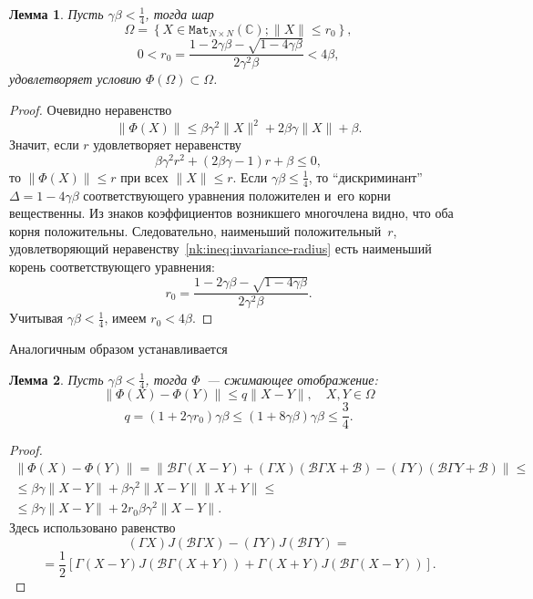 \documentclass[14pt,a4paper]{extarticle}
\numberwithin{equation}{section}
\newtheorem{lem}{Лемма}
\theoremstyle{definition}
\begin{document}
\begin{lem}
    Пусть \( \gamma\beta < \frac14\),
    тогда шар
    \[
        \Omega = \left\{ X\in \mathtt{Mat}_{N{\times}N}(\mathbb{C}); \|X\| \leq r_0 \right\}, \]
    \[  0 < r_0 = \frac{1 - 2\gamma\beta - \sqrt{1-4\gamma\beta}}{2\gamma^2\beta} < 4\beta, \]
    удовле\-творяет условию \( \Phi(\Omega)\subset\Omega \).
\end{lem}
\begin{proof}
Очевидно неравенство
    \[ \| \Phi(X) \| \leq
     \beta \gamma^2 \|X\|^2 + 2\beta\gamma\|X\| + \beta. \]
Значит, если \( r \) удовле\-творяет неравенству
    \begin{equation}\label{nk:ineq:invariance-radius}
        \beta \gamma^2 r^2 + (2\beta\gamma - 1)r + \beta \leq 0,
    \end{equation}
    то \( \|\Phi(X)\| \leq r \) при всех \( \|X\| \leq r \).
Если \( \gamma\beta \leq \frac14 \),
    то ``дискриминант'' \( \Delta = 1-4\gamma\beta \)
    соответствующего уравнения положителен и~его корни вещественны.
Из знаков коэффициентов возникшего многочлена видно, что оба корня положительны.
Следовательно, наименьший положительный~\( r \),
    удовле\-творя\-ющий неравенству~\eqref{nk:ineq:invariance-radius}
    есть наименьший корень
    соответствующего уравнения:
    \[ r_0 = \frac{1 - 2\gamma\beta - \sqrt{1-4\gamma\beta}}{2\gamma^2\beta}. \]
Учитывая \( \gamma\beta<\frac14 \), имеем \( r_0 < 4\beta \).
\end{proof}

Аналогичным образом устанавливается
\begin{lem}
    Пусть \(\gamma\beta<\frac14\),
    тогда \( \Phi \)~--- сжимающее отображение:
    \[ \| \Phi(X) - \Phi(Y) \| \leq q \|X - Y\|, \quad X,Y\in\Omega \]
    \[ q = (1+2\gamma r_0) \gamma\beta \leq (1+8\gamma\beta)\gamma\beta \leq \frac34. \]
\end{lem}
\begin{proof}
    \begin{align*} \| \Phi(X) - \Phi(Y) \| = \| \mathcal{B}\Gamma (X-Y) + (\Gamma X)(\mathcal{B}\Gamma X + \mathcal{B})
     - (\Gamma Y)(\mathcal{B} \Gamma Y + \mathcal{B}) \| \leq \\
        \leq
     \beta\gamma\|X-Y\| +
     \beta \gamma^2 \|X-Y\| \|X+Y\| \leq \\
        \leq
     \beta\gamma\|X-Y\| +
      2 r_0 \beta \gamma^2 \|X-Y\|.
    \end{align*}
Здесь использовано равенство
\[ (\Gamma X) J(\mathcal{B}\Gamma X) - (\Gamma Y) J(\mathcal{B}\Gamma Y) =
  \]
 \[= \frac12\left[
        \Gamma(X-Y) J(\mathcal{B}\Gamma(X+Y))
    +   \Gamma(X+Y) J(\mathcal{B}\Gamma(X-Y))
  \right].
\]
\end{proof}
\end{document}
